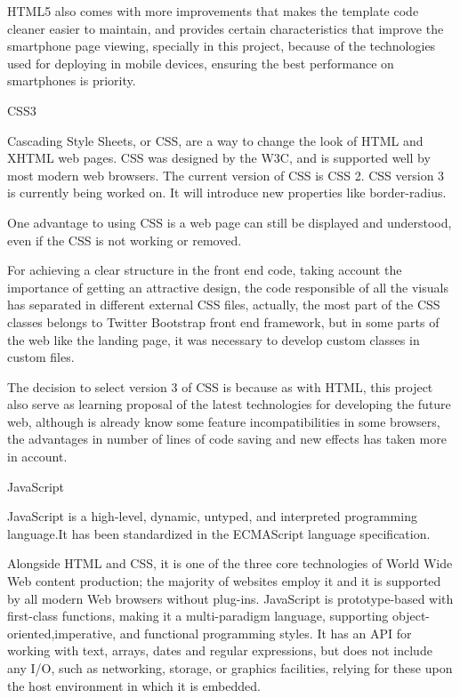 \documentclass{DeustoFDP}
\begin{document}
HTML5 also comes with more improvements that makes the template code cleaner easier to maintain, and provides certain characteristics that improve the smartphone page viewing, specially in this project, because of the technologies used for deploying in mobile devices, ensuring the best performance on smartphones is priority.

{\large CSS3}

Cascading Style Sheets, or CSS, are a way to change the look of HTML and XHTML web pages. CSS was designed by the W3C, and is supported well by most modern web browsers. The current version of CSS is CSS 2. CSS version 3 is currently being worked on. It will introduce new properties like border-radius. \cite{css}

One advantage to using CSS is a web page can still be displayed and understood, even if the CSS is not working or removed.

For achieving a clear structure in the front end code, taking account the importance of getting an attractive design, the code responsible of all the visuals has separated in different external CSS files, actually, the most part of the CSS classes belongs to Twitter Bootstrap front end framework, but in some parts of the web like the landing page, it was necessary to develop custom classes in custom files.

The decision to select version 3 of CSS is because as with HTML, this project also serve as learning proposal of the latest technologies for developing the future web, although is already know some feature incompatibilities in some browsers, the advantages in number of lines of code saving and new effects has taken more in account.

{\large JavaScript}

JavaScript is a high-level, dynamic, untyped, and interpreted programming language.It has been standardized in the ECMAScript language specification. 

Alongside HTML and CSS, it is one of the three core technologies of World Wide Web content production; the majority of websites employ it and it is supported by all modern Web browsers without plug-ins. JavaScript is prototype-based with first-class functions, making it a multi-paradigm language, supporting object-oriented,imperative, and functional programming styles. It has an API for working with text, arrays, dates and regular expressions, but does not include any I/O, such as networking, storage, or graphics facilities, relying for these upon the host environment in which it is embedded. \cite{javascript}
\end{document}
